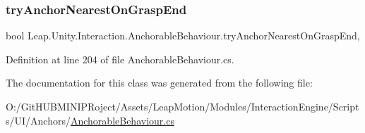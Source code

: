 \subsubsection{\texorpdfstring{tryAnchorNearestOnGraspEnd}{tryAnchorNearestOnGraspEnd}}
{\footnotesize\ttfamily bool Leap.\+Unity.\+Interaction.\+Anchorable\+Behaviour.\+try\+Anchor\+Nearest\+On\+Grasp\+End\hspace{0.3cm}{\ttfamily [get]}, {\ttfamily [set]}}



Definition at line 204 of file Anchorable\+Behaviour.\+cs.



The documentation for this class was generated from the following file\+:\begin{DoxyCompactItemize}
\item 
O\+:/\+Git\+H\+U\+B\+M\+I\+N\+I\+P\+Roject/\+Assets/\+Leap\+Motion/\+Modules/\+Interaction\+Engine/\+Scripts/\+U\+I/\+Anchors/\mbox{\hyperlink{_anchorable_behaviour_8cs}{Anchorable\+Behaviour.\+cs}}\end{DoxyCompactItemize}
